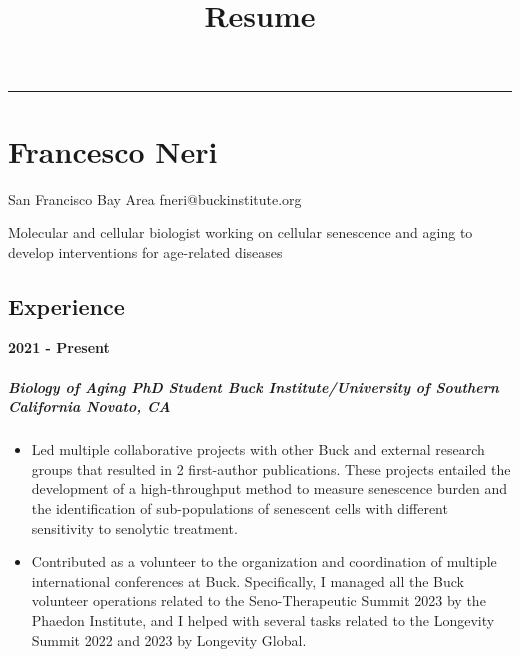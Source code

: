 \documentclass[
  letterpaper,
  DIV=11,
  numbers=noendperiod]{scrartcl}
\title{Resume}
\author{}
\date{}
\let\oldsubparagraph\subparagraph
\renewcommand{\subparagraph}[1]{\oldsubparagraph{#1}\mbox{}}
\providecommand{\tightlist}{%
  \setlength{\itemsep}{0pt}\setlength{\parskip}{0pt}}\usepackage{longtable,booktabs,array}
\begin{document}
\maketitle
\ifdefined\Shaded\renewenvironment{Shaded}{\begin{tcolorbox}[interior hidden, borderline west={3pt}{0pt}{shadecolor}, sharp corners, frame hidden, enhanced, breakable, boxrule=0pt]}{\end{tcolorbox}}\fi

\begin{center}\rule{0.5\linewidth}{0.5pt}\end{center}

\hypertarget{francesco-neri}{%
\section{Francesco Neri}\label{francesco-neri}}

San Francisco Bay Area \textbar{} fneri@buckinstitute.org

Molecular and cellular biologist working on cellular senescence and
aging to develop interventions for age-related diseases

\hypertarget{experience}{%
\subsection{Experience}\label{experience}}

\textbf{2021 - Present}

\hypertarget{biology-of-aging-phd-student-buck-instituteuniversity-of-southern-california-novato-ca}{%
\subparagraph{\texorpdfstring{\textbf{Biology of Aging PhD Student
\textbar{} Buck Institute/University of Southern California \textbar{}
Novato,
CA}}{Biology of Aging PhD Student \textbar{} Buck Institute/University of Southern California \textbar{} Novato, CA}}\label{biology-of-aging-phd-student-buck-instituteuniversity-of-southern-california-novato-ca}}

\begin{itemize}
\tightlist
\item
  Led multiple collaborative projects with other Buck and external
  research groups that resulted in 2 first-author publications. These
  projects entailed the development of a high-throughput method to
  measure senescence burden and the identification of sub-populations of
  senescent cells with different sensitivity to senolytic treatment.
\item
  Contributed as a volunteer to the organization and coordination of
  multiple international conferences at Buck. Specifically, I managed
  all the Buck volunteer operations related to the Seno-Therapeutic
  Summit 2023 by the Phaedon Institute, and I helped with several tasks
  related to the Longevity Summit 2022 and 2023 by Longevity Global.
\end{itemize}
\end{document}

